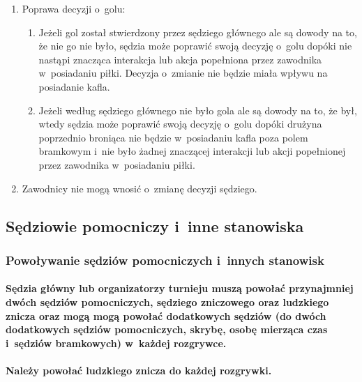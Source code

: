 \documentclass[12pt,a4paper]{article}
\begin{document}
\begin{enumerate}
	\item
	      Poprawa decyzji o~golu:

	      \begin{enumerate}
		      \item
		            Jeżeli gol został stwierdzony przez sędziego głównego ale są dowody
		            na to, że nie go nie było, sędzia może poprawić swoją decyzję o~golu
		            dopóki nie nastąpi znacząca interakcja lub akcja popełniona przez
		            zawodnika w~posiadaniu piłki. Decyzja o~zmianie nie będzie miała
		            wpływu na posiadanie kafla.
		      \item
		            Jeżeli według sędziego głównego nie było gola ale są dowody na to,
		            że był, wtedy sędzia może poprawić swoją decyzję o~golu dopóki
		            drużyna poprzednio broniąca nie będzie w~posiadaniu kafla poza polem
		            bramkowym i~nie było żadnej znaczącej interakcji lub akcji
		            popełnionej przez zawodnika w~posiadaniu piłki.
	      \end{enumerate}
	\item
	      Zawodnicy nie mogą wnosić o~zmianę decyzji sędziego.
\end{enumerate}

\subsection{Sędziowie pomocniczy i~inne stanowiska}

\subsubsection{Powoływanie sędziów pomocniczych i~innych stanowisk}

\paragraph{Sędzia główny lub organizatorzy turnieju muszą powołać
	przynajmniej dwóch sędziów pomocniczych, sędziego zniczowego oraz
	ludzkiego znicza oraz mogą mogą powołać dodatkowych sędziów (do dwóch
	dodatkowych sędziów pomocniczych, skrybę, osobę mierząca czas i~sędziów
	bramkowych) w~każdej rozgrywce.}

\paragraph{Należy powołać ludzkiego znicza do każdej rozgrywki.}
\end{document}
